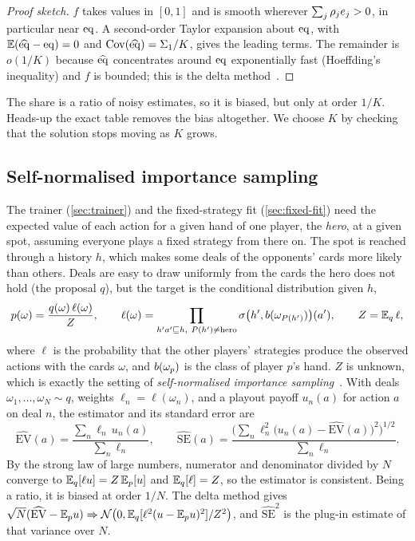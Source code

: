 \begin{proof}[Proof sketch]
$f$ takes values in $[0,1]$ and is smooth wherever $\sum_j \rho_j e_j > 0$, in particular near $\mathrm{eq}$. A second-order
Taylor expansion about $\mathrm{eq}$, with $\mathbb{E}(\widehat{\mathrm{eq}} - \mathrm{eq}) = 0$ and $\operatorname{Cov}(\widehat{\mathrm{eq}}) = \Sigma_1/K$,
gives the leading terms. The remainder is $o(1/K)$ because $\widehat{\mathrm{eq}}$ concentrates around $\mathrm{eq}$ exponentially fast
(Hoeffding's inequality) and $f$ is bounded; this is the delta method~\cite{owen2013}.
\end{proof}

The share is a ratio of noisy estimates, so it is biased, but only at order $1/K$. Heads-up the exact table removes
the bias altogether. We choose $K$ by checking that the solution stops moving as $K$ grows.

\subsection{Self-normalised importance sampling}\label{sec:snis}

The trainer (\cref{sec:trainer}) and the fixed-strategy fit (\cref{sec:fixed-fit}) need the expected value of each
action for a given hand of one player, the \emph{hero}, at a given spot, assuming everyone plays a fixed strategy from
there on. The spot is reached through a history $h$, which makes some deals of the opponents' cards more likely than
others. Deals are easy to draw uniformly from the cards the hero does not hold (the proposal $q$), but the target is
the conditional distribution given $h$,
\[
  p(\omega) = \frac{q(\omega)\,\ell(\omega)}{Z}, \qquad \ell(\omega) = \prod_{h'a' \sqsubseteq h,\ P(h') \ne \text{hero}}
  \sigma\big(h', b(\omega_{P(h')})\big)(a'), \qquad Z = \mathbb{E}_q\,\ell,
\]
where $\ell$ is the probability that the other players' strategies produce the observed actions with the cards
$\omega$, and $b(\omega_p)$ is the class of player $p$'s hand. $Z$ is unknown, which is exactly the setting of
\emph{self-normalised importance sampling}~\cite{owen2013}. With deals $\omega_1,\dots,\omega_N \sim q$, weights
$\ell_n = \ell(\omega_n)$, and a playout payoff $u_n(a)$ for action $a$ on deal $n$, the estimator and its standard
error are
\begin{equation}\label{eq:snis}
  \widehat{\mathrm{EV}}(a) = \frac{\sum_{n} \ell_n\, u_n(a)}{\sum_n \ell_n}, \qquad
  \widehat{\mathrm{SE}}(a) = \frac{\big(\sum_n \ell_n^2 \big(u_n(a) - \widehat{\mathrm{EV}}(a)\big)^2\big)^{1/2}}{\sum_n \ell_n}.
\end{equation}
By the strong law of large numbers, numerator and denominator divided by $N$ converge to $\mathbb{E}_q[\ell u] = Z\,\mathbb{E}_p[u]$
and $\mathbb{E}_q[\ell] = Z$, so the estimator is consistent. Being a ratio, it is biased at order $1/N$. The delta method gives
$\sqrt N(\widehat{\mathrm{EV}} - \mathbb{E}_p u) \Rightarrow \mathcal N\big(0, \mathbb{E}_q[\ell^2 (u-\mathbb{E}_p u)^2] / Z^2\big)$, and
$\widehat{\mathrm{SE}}^2$ is the plug-in estimate of that variance over $N$.

